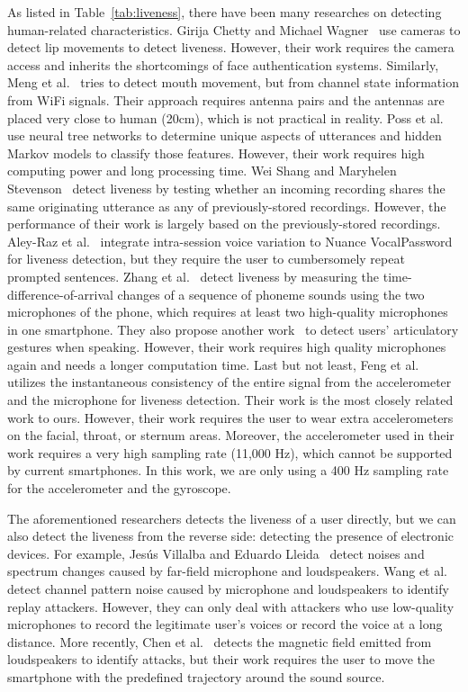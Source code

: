 As listed in Table~\ref{tab:liveness}, there have been many researches on detecting human-related characteristics.  
Girija Chetty and Michael Wagner~\cite{chetty2004automated} use cameras to detect lip movements to detect liveness. However, their work requires the camera access and inherits the shortcomings of face authentication systems. Similarly, Meng et al.~\cite{meng2018wivo} tries to detect mouth movement, but from channel state information from WiFi signals. Their approach requires antenna pairs and the antennas are placed very close to human (20cm), which is not practical in reality.
Poss et al.~\cite{poss2008biometric} use neural tree networks to determine unique aspects of utterances and hidden Markov models to classify those features. However, their work requires high computing power and long processing time. 
Wei Shang and Maryhelen Stevenson~\cite{shang2010score} detect liveness by testing whether an incoming recording shares the same originating utterance as any of previously-stored recordings. However, the performance of their work is largely based on the previously-stored recordings. 
Aley-Raz et al.~\cite{aley2013device} integrate intra-session voice variation to Nuance VocalPassword~\cite{onlinenuance} for liveness detection, but they require the user to cumbersomely repeat prompted sentences.
Zhang et al.~\cite{zhang2016voicelive} detect liveness by measuring the time-difference-of-arrival changes of a sequence of phoneme sounds using the two microphones of the phone, which requires at least two high-quality microphones in one smartphone. They also propose another work~\cite{zhang2017hearing} to detect users' articulatory gestures when speaking. However, their work requires high quality microphones again and needs a longer computation time.
Last but not least, Feng et al.~\cite{feng2017continuous}  utilizes the instantaneous consistency of the entire signal from the accelerometer and the microphone for liveness detection. Their work is the most closely related work to ours. However,  their work requires the user to wear extra accelerometers on the facial, throat, or sternum areas. Moreover, the accelerometer used in their work requires a very high sampling rate (11,000 Hz), which cannot be supported by current smartphones. In this work, we are only using a 400 Hz sampling rate for the accelerometer and the gyroscope.

The aforementioned researchers detects the liveness of a user directly, but we can also detect the liveness from the reverse side: detecting the presence of electronic devices. For example, Jes{\'u}s Villalba and Eduardo Lleida~\cite{villalba2011detecting}  detect noises and spectrum changes caused by far-field microphone and loudspeakers. Wang et al.~\cite{wang2011channel} detect channel pattern noise caused by microphone and loudspeakers to identify replay attackers. However, they can only deal with attackers who use low-quality microphones to record the legitimate user's voices or record the voice at a long distance. More recently, Chen et al.~\cite{chen2017you} detects the magnetic field emitted from loudspeakers to identify attacks, but their work requires the user to move the smartphone with the predefined trajectory around the sound source.


